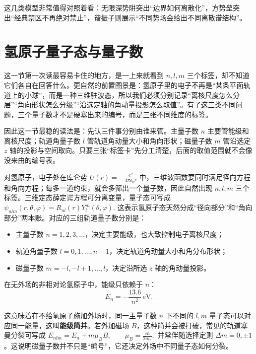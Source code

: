 \documentclass[lang=cn,11pt]{elegantbook}
\newcommand{\bridge}[1]{\begin{note}#1\end{note}}
\begin{document}
\begin{remark}
这几类模型非常值得对照着看：无限深势阱突出“边界如何离散化”，方势垒突出“经典禁区不再绝对禁止”，谐振子则展示“不同势场会给出不同离散谱结构”。
\end{remark}

\section{氢原子量子态与量子数}

这一节第一次读最容易卡住的地方，是一上来就看到 \(n,l,m\) 三个标签，却不知道它们各自在回答什么。更自然的前置图景是：氢原子里的电子不再是“某条平面轨道上的小球”，而是一种三维驻波态，所以我们必须分别记录“离核尺度怎么分层”“角向形状怎么分级”“沿选定轴的角动量投影怎么取值”。有了这三类不同问题，三个量子数才不是硬塞出来的编号，而是三张不同维度的标签。

\bridge{因此这一节最稳的读法是：先认三件事分别由谁来管。主量子数 \(n\) 主要管能级和离核尺度；轨道角量子数 \(l\) 管轨道角动量大小和角向形状；磁量子数 \(m\) 管沿选定 \(z\) 轴的投影与空间取向。只要三张“标签卡”先分工清楚，后面的取值范围就不会像没来由的编号表。}

对氢原子，电子处在库仑势
 \(U(r)=-\frac{e^2}{4\pi\varepsilon_0 r}\) 
中，三维波函数要同时满足径向方程和角向方程；每多一道约束，就会多筛出一个量子数，因此自然出现 \(n,l,m\) 三个标签。三维定态薛定谔方程可分离变量，量子态可写成
 \(\psi_{nlm}(r,\theta,\varphi)=R_{nl}(r)Y_l^m(\theta,\varphi).\) 
这表示氢原子态天然分成“径向部分”和“角向部分”两本账。对应的三组轨道量子数分别是：
\begin{itemize}
 \item 主量子数 \(n=1,2,3,\dots\)，决定主要能级，也大致控制电子离核尺度；
 \item 轨道角量子数 \(l=0,1,\dots,n-1\)，决定轨道角动量大小和角分布形状；
 \item 磁量子数 \(m=-l,-l+1,\dots,l\)，决定沿所选 \(z\) 轴的角动量投影。
\end{itemize}

在无外场的非相对论氢原子中，能级只依赖于 \(n\)：
\[
E_n=-\frac{13.6}{n^2}\,\mathrm{eV}.
\]

\begin{remark}
这意味着在不给氢原子施加外场时，同一主量子数 \(n\) 下不同的 \(l,m\) 量子态可以对应同一能量，这叫\textbf{能级简并}。若外加磁场 \(B\)，这种简并会被打破，常见的轨道塞曼分裂可写成
 \(E_{nlm}=E_n+m\mu_B B, \qquad \mu_B=\frac{e\hbar}{2m_e},\) 
并常伴随选择定则 \(\Delta m=0,\pm1\)。这说明磁量子数并不只是“编号”，它还决定外场中不同量子态如何分裂。
\end{remark}
\end{document}
